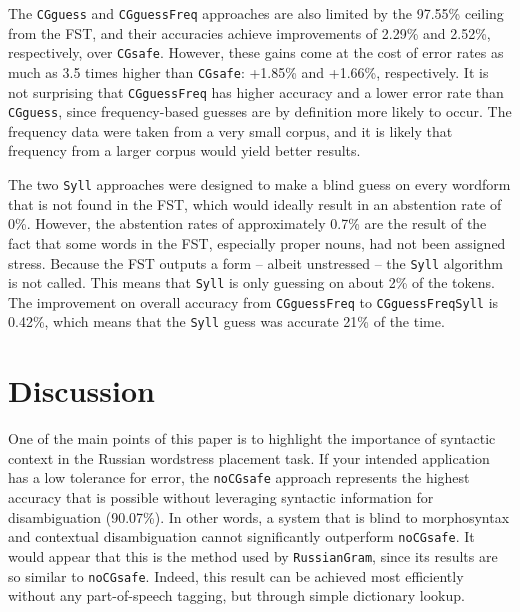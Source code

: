 \documentclass[11pt]{article}
\newcommand{\rr}[1]{\marginpar{\scriptsize R: #1}} %
\begin{document}
The {\small {\tt CGguess}} and {\small {\tt CGguessFreq}} approaches are also 
limited by the 97.55\% ceiling from the FST, and their accuracies achieve
improvements of 2.29\% and 2.52\%, respectively, over {\small {\tt CGsafe}}.
However, these gains come at the cost of error rates as much as 3.5 times 
higher than {\small {\tt CGsafe}}: +1.85\% and +1.66\%, respectively. It is
not surprising that {\small {\tt CGguessFreq}} has higher accuracy and a lower
error rate than {\small {\tt CGguess}}, since frequency-based guesses are by
definition more likely to occur. The frequency data were taken from a very 
small corpus, and it is likely that frequency from a larger corpus would yield 
better results.

The two {\small {\tt Syll}} approaches were designed to make a blind guess on 
every wordform that is not found in the FST, which would ideally result in an
abstention rate of 0\%. However, the abstention rates of approximately 0.7\%
are the result of the fact that some words in the FST, especially proper nouns, 
had not been assigned stress. Because the FST outputs a form -- albeit unstressed 
-- the {\small {\tt Syll}} algorithm is not called. This means that 
{\small {\tt Syll}} is only guessing on about 2\% of the tokens. The improvement
on overall accuracy from {\small {\tt CGguessFreq}} to 
{\small {\tt CGguessFreqSyll}} is 0.42\%, which means that the 
{\small {\tt Syll}} guess was accurate 21\% of the time.

\rr{Examine errors and categorize/refute them.}

\section{Discussion} \label{discussion}

One of the main points of this paper is to highlight the importance of 
syntactic context in the Russian wordstress placement task. If your intended 
application has a low tolerance for error, the 
{\small {\tt noCGsafe}} approach represents the highest accuracy that is possible 
without leveraging syntactic information for disambiguation (90.07\%). In other words, a 
system that is blind to morphosyntax and contextual disambiguation cannot
significantly outperform {\small {\tt noCGsafe}}. It would appear that this is
the method used by {\small {\tt RussianGram}}, since its results are so similar
to {\small {\tt noCGsafe}}. Indeed, this result can be achieved most efficiently
without any part-of-speech tagging, but through simple dictionary lookup.
\end{document}
